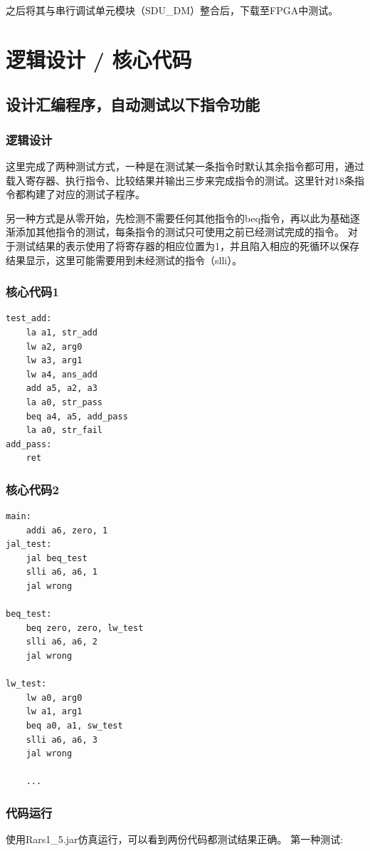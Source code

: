 \documentclass[a4paper]{article}
\begin{document}
之后将其与串行调试单元模块（SDU\_DM）整合后，下载至FPGA中测试。

\section{逻辑设计 / 核心代码}
\subsection{设计汇编程序，自动测试以下指令功能}
\subsubsection{逻辑设计}
这里完成了两种测试方式，一种是在测试某一条指令时默认其余指令都可用，通过载入寄存器、执行指令、比较结果并输出三步来完成指令的测试。这里针对18条指令都构建了对应的测试子程序。

另一种方式是从零开始，先检测不需要任何其他指令的beq指令，再以此为基础逐渐添加其他指令的测试，每条指令的测试只可使用之前已经测试完成的指令。
对于测试结果的表示使用了将寄存器的相应位置为1，并且陷入相应的死循环以保存结果显示，这里可能需要用到未经测试的指令（slli）。
\subsubsection{核心代码1}
\begin{lstlisting}[language={[RISC-V]Assembler},title={test.asm}] 
test_add:
    la a1, str_add
    lw a2, arg0
    lw a3, arg1
    lw a4, ans_add
    add a5, a2, a3
    la a0, str_pass
    beq a4, a5, add_pass
    la a0, str_fail
add_pass:
    ret
\end{lstlisting}

\subsubsection{核心代码2}
\begin{lstlisting}[language={[RISC-V]Assembler},title={test1.asm}] 
main:
    addi a6, zero, 1
jal_test:
    jal beq_test
    slli a6, a6, 1
    jal wrong

beq_test:
    beq zero, zero, lw_test
    slli a6, a6, 2
    jal wrong

lw_test:
    lw a0, arg0
    lw a1, arg1
    beq a0, a1, sw_test
    slli a6, a6, 3
    jal wrong

    ...
    \end{lstlisting}

\subsubsection{代码运行}
使用Rars1\_5.jar仿真运行，可以看到两份代码都测试结果正确。
第一种测试:
\end{document}
